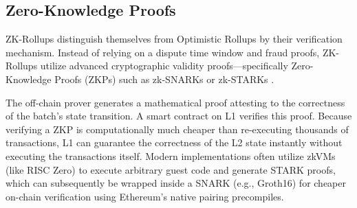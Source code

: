 \subsection{Zero-Knowledge Proofs}
\label{sec:zk_proofs}

ZK-Rollups distinguish themselves from Optimistic Rollups by their verification mechanism. Instead of relying on a dispute time window and fraud proofs, ZK-Rollups utilize advanced cryptographic validity proofs—specifically Zero-Knowledge Proofs (ZKPs) such as zk-SNARKs or zk-STARKs \citep{ben2018stark}.

The off-chain prover generates a mathematical proof attesting to the correctness of the batch's state transition. A smart contract on L1 verifies this proof. Because verifying a ZKP is computationally much cheaper than re-executing thousands of transactions, L1 can guarantee the correctness of the L2 state instantly without executing the transactions itself. Modern implementations often utilize zkVMs (like RISC Zero) to execute arbitrary guest code and generate STARK proofs, which can subsequently be wrapped inside a SNARK (e.g., Groth16) for cheaper on-chain verification using Ethereum's native pairing precompiles.

